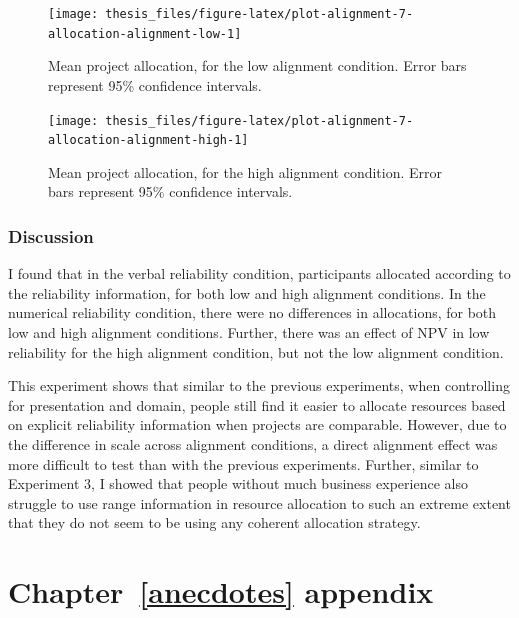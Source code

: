 \documentclass[a4paper, nobind, dvipsnames]{templates/ociamthesis}
\theoremstyle{definition}
\theoremstyle{definition}
\theoremstyle{definition}
\theoremstyle{definition}
\theoremstyle{remark}
\begin{document}
\begin{figure}
\texttt{[image: thesis\_files/figure-latex/plot-alignment-7-allocation-alignment-low-1]} \caption{Mean project allocation, for the low alignment condition. Error bars represent 95\% confidence intervals.}\label{fig:plot-alignment-7-allocation-alignment-low}
\end{figure}



\begin{figure}
\texttt{[image: thesis\_files/figure-latex/plot-alignment-7-allocation-alignment-high-1]} \caption{Mean project allocation, for the high alignment condition. Error bars represent 95\% confidence intervals.}\label{fig:plot-alignment-7-allocation-alignment-high}
\end{figure}

\hypertarget{discussion-15}{%
\subsection{Discussion}\label{discussion-15}}

I found that in the verbal reliability condition, participants allocated
according to the reliability information, for both low and high alignment
conditions. In the numerical reliability condition, there were no differences in
allocations, for both low and high alignment conditions. Further, there was an
effect of NPV in low reliability for the high alignment condition, but not the
low alignment condition.

This experiment shows that similar to the previous experiments, when controlling
for presentation and domain, people still find it easier to allocate resources
based on explicit reliability information when projects are comparable. However,
due to the difference in scale across alignment conditions, a direct alignment
effect was more difficult to test than with the previous experiments. Further,
similar to Experiment 3, I showed that people without much business experience
also struggle to use range information in resource allocation to such an extreme
extent that they do not seem to be using any coherent allocation strategy.

\hypertarget{anecdotes-appendix}{%
\chapter{Chapter~\ref{anecdotes} appendix}\label{anecdotes-appendix}}

\minitoc
\end{document}
